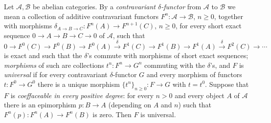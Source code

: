 \begin{lemma}
\label{lem:pc-coeffaceable-universal}
Let $\mathcal A,\mathcal B$ be abelian categories.  By a
\emph{contravariant $\delta$-functor} from $\mathcal A$ to
$\mathcal B$ we mean a collection of additive contravariant functors
$F^n:\mathcal A\to\mathcal B$, $n\ge0$, together with morphisms
$\delta_{A\to B\to C}:F^n(A)\to F^{n+1}(C)$, $n\ge0$, for every short
exact sequence $0\to A\to B\to C\to0$ of $\mathcal A$, such that
\[
0\to F^0(C)\to F^0(B)\to F^0(A)\xrightarrow{\ \delta\ }
F^1(C)\to F^1(B)\to F^1(A)\xrightarrow{\ \delta\ }F^2(C)\to\cdots
\]
is exact and such that the $\delta$'s commute with morphisms of short
exact sequences; \emph{morphisms} of such are collections
$t^n:F^n\to G^n$ commuting with the $\delta$'s, and $F$ is
\emph{universal} if for every contravariant $\delta$-functor $G$ and
every morphism of functors $t:F^0\to G^0$ there is a unique morphism
$\{t^n\}_{n\ge0}:F\to G$ with $t=t^0$.  Suppose that $F$ is
\emph{coeffaceable in every positive degree}: for every $n>0$ and
every object $A$ of $\mathcal A$ there is an epimorphism $p:B\to A$
(depending on $A$ and $n$) such that
$F^n(p):F^n(A)\to F^n(B)$ is zero.  Then $F$ is universal.
\end{lemma}
